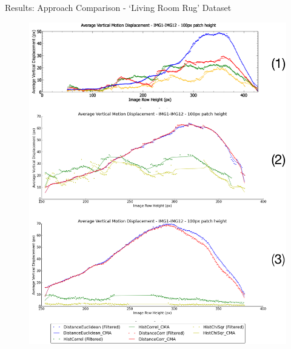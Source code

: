 \documentclass[10pt, compress]{beamer}
\begin{document}
\begin{frame}{Results: Approach Comparison - `Living Room Rug' Dataset}

\begin{figure}[ht!]
\centering
\vspace{-0.5cm}
\includegraphics[scale=0.145]{flat_pres_results.png}
\end{figure}

\end{frame}
\end{document}

